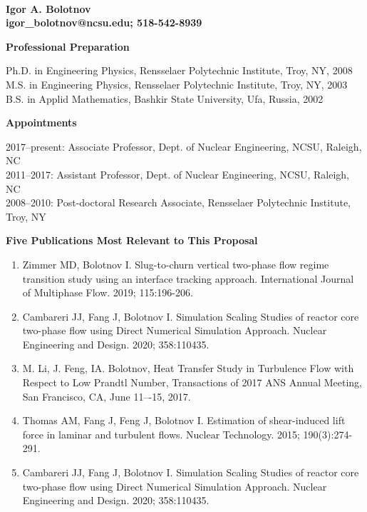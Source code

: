 \documentclass[11pt,letterpaper,english]{article}
\begin{document}
\setlength{\parindent}{0in} %

\pagestyle{fancy}   \renewcommand{%
\headrulewidth}{0.0pt}



\\
{\bf Igor A. Bolotnov}\\
{\bf igor\_bolotnov@ncsu.edu; 518-542-8939} \smallskip

\begin{flushleft} {\bf Professional Preparation}
{\parindent 16pt

Ph.D. in Engineering Physics, Rensselaer Polytechnic Institute, Troy, NY, 2008\\
M.S.  in Engineering Physics, Rensselaer Polytechnic Institute, Troy, NY, 2003\\
B.S. in Applid Mathematics, Bashkir State University, Ufa, Russia, 2002 \\
}

\vspace{.04in}
{\bf Appointments}
{\parindent 16pt

2017--present: Associate Professor, Dept. of Nuclear Engineering, NCSU, Raleigh, NC \\
2011--2017: Assistant Professor, Dept. of Nuclear Engineering, NCSU, Raleigh, NC \\
2008--2010: Post-doctoral Research Associate, Rensselaer Polytechnic Institute, Troy, NY \\
}

\vspace{.04in}
{\bf Five Publications Most Relevant to This Proposal}
\vspace{-6pt}
\begin{enumerate} \itemsep1pt \parskip0pt 
\item Zimmer MD, Bolotnov I. Slug-to-churn vertical two-phase flow regime transition study using an
interface tracking approach. International Journal of Multiphase Flow. 2019; 115:196-206. \\
\item Cambareri JJ, Fang J, Bolotnov I. Simulation Scaling Studies of reactor core two-phase flow
using Direct Numerical Simulation Approach. Nuclear Engineering and Design. 2020;
358:110435. \\
\item M. Li, J. Feng, IA. Bolotnov, Heat Transfer Study in Turbulence Flow with Respect to Low Prandtl Number,  Transactions of 2017 ANS Annual Meeting, San Francisco, CA, June 11–-15, 2017. \\
\item Thomas AM, Fang J, Feng J, Bolotnov I. Estimation of shear-induced lift force in laminar and
turbulent flows. Nuclear Technology. 2015; 190(3):274-291. \\
\item Cambareri JJ, Fang J, Bolotnov I. Simulation Scaling Studies of reactor core two-phase flow
using Direct Numerical Simulation Approach. Nuclear Engineering and Design. 2020;
358:110435. \\
\end{enumerate}


\end{flushleft}
\end{document}
